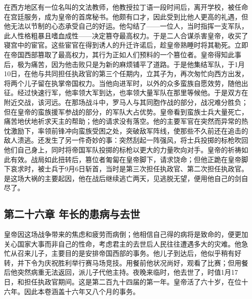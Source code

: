 在西方地区有一位名叫的文法教师，他教授拉丁语一段时间后，离开学校，被任命在宫廷服务，成为皇帝的首席秘书。他颇有口才，因此受到比他人更高的礼遇，但他无法以节制的心态承受自己的好运。他勾结了——一位人，当时指挥一支军队，此人性格粗暴且嗜血成性——决定篡夺最高权力。于是二人合谋杀害皇帝，收买了寝宫中的宦官。这些宦官在得到诱人的升迁许诺后，趁皇帝熟睡时将其勒死。立即在帝国西部篡取了最高权力，其行为正如人们预料的一个篡位者。皇帝得知此事后，极为痛苦，因为他击败只是为新的麻烦铺平了道路。于是他集结军队，于1月10日，在他与共同担任执政官的第三个任期内，立其子为，再次匆忙向西方出发，将两个儿子留在执掌帝国权力。当他向进军时，以外的众多蛮族自愿效劳，随他出征。经过快速行军，他率领大军到达，也率领大量军队在那里等候他。于是双方在附近交战，该河远。在那场战斗中，罗马人与其同胞作战的部分，战况难分胜负；但在皇帝的蛮族援军参战的部分，的军队大占优势。皇帝看到蛮族士兵大量死亡，痛苦地伏地祈求天主的帮助；他的请求没有落空。他的主要军官在突然而异常的热忱激励下，率领前锋冲向蛮族受困之处，突破敌军阵线，使那些不久前还在追击的敌人溃逃。还发生了另一件奇妙的事：突然刮起一阵强风，将士兵投掷的标枪吹回他们自己身上，同时将帝国军队投掷的标枪以更大的力量吹向对手。皇帝的祈祷如此有效。战局如此扭转后，篡位者匍匐在皇帝脚下，请求饶命；但他正跪在皇帝脚下哀求时，被士兵于9月6日斩首，当时是第三次担任执政官、第二次担任执政官。是这场大祸的主要起因，他在战后继续逃亡两天，见逃脱无望，便用他自己的剑自尽了。\par


\subsection{第二十六章 年长的患病与去世}

皇帝因这场战争带来的焦虑和疲劳而病倒；他相信自己得的病将是致命的，便更加关心国家大事而非自己的性命，考虑君主的去世后人民往往遭遇多大的灾难。他急忙从召来儿子，主要目的是安排帝国西部的事务。他儿子到达后，他似乎稍有好转，并下令为庆祝胜利举行赛马场竞技。用餐前他状况尚好，观看了比赛；但用餐后他突然病重无法返回，派儿子代他主持。夜晚来临时，他去世了，时值1月17日，和担任执政官期间。这是第二百九十四届的第一年。皇帝活了六十岁，在位十六年。因此本卷涵盖十六年又八个月的事务。\par

